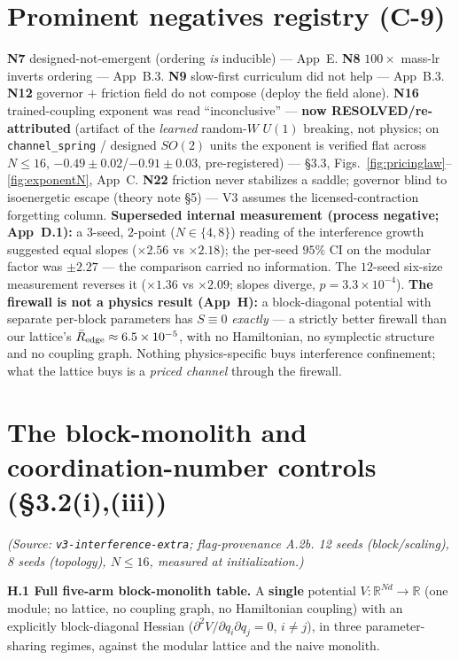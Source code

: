\documentclass[11pt]{article}
\newcommand{\R}{\mathbb{R}}
\begin{document}
\section{Prominent negatives registry (C-9)}
\textbf{N7} designed-not-emergent (ordering \emph{is} inducible) --- App~E. \textbf{N8} $100\times$ mass-lr inverts ordering --- App~B.3. \textbf{N9} slow-first curriculum did not help --- App~B.3. \textbf{N12} governor $+$ friction field do not compose (deploy the field alone). \textbf{N16} trained-coupling exponent was read ``inconclusive'' --- \textbf{now RESOLVED/re-attributed} (artifact of the \emph{learned} random-$W$ $U(1)$ breaking, not physics; on \texttt{channel\_spring} / designed $SO(2)$ units the exponent is verified flat across $N\le16$, $-0.49\pm0.02$/$-0.91\pm0.03$, pre-registered) --- \S3.3, Figs.~\ref{fig:pricinglaw}--\ref{fig:exponentN}, App~C. \textbf{N22} friction never stabilizes a saddle; governor blind to isoenergetic escape (theory note \S5) --- V3 assumes the licensed-contraction forgetting column. \textbf{Superseded internal measurement (process negative; App~D.1):} a $3$-seed, $2$-point ($N\in\{4,8\}$) reading of the interference growth suggested equal slopes ($\times2.56$ vs $\times2.18$); the per-seed $95\%$ CI on the modular factor was $\pm2.27$ --- the comparison carried no information. The $12$-seed six-size measurement reverses it ($\times1.36$ vs $\times2.09$; slopes diverge, $p=3.3\times10^{-4}$). \textbf{The firewall is not a physics result (App~H):} a block-diagonal potential with separate per-block parameters has $S\equiv0$ \emph{exactly} --- a strictly better firewall than our lattice's $\bar R_{\rm edge}\approx6.5\times10^{-5}$, with no Hamiltonian, no symplectic structure and no coupling graph. Nothing physics-specific buys interference confinement; what the lattice buys is a \emph{priced channel} through the firewall.

\section{The block-monolith and coordination-number controls (\S3.2(i),(iii))}
\emph{(Source: \texttt{v3-interference-extra}; flag-provenance A.2b. 12 seeds (block/scaling), 8 seeds (topology), $N\le16$, measured at initialization.)}

\textbf{H.1 Full five-arm block-monolith table.} A \textbf{single} potential $V:\R^{Nd}\to\R$ (one module; no lattice, no coupling graph, no Hamiltonian coupling) with an explicitly block-diagonal Hessian ($\partial^2V/\partial q_i\partial q_j=0$, $i\ne j$), in three parameter-sharing regimes, against the modular lattice and the naive monolith.
\end{document}
